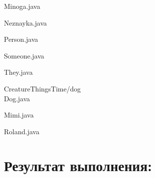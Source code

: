 \documentclass[12pt,onecolumn]{article}
\begin{document}
Minoga.java

Neznayka.java

Person.java

Someone.java

They.java

CreatureThingsTime/dog\\
Dog.java

Mimi.java

Roland.java

\section{Результат выполнения:}
\end{document}
